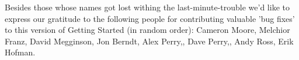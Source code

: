 Besides those whose names got lost withing the last-minute-trouble we'd like to express our
gratitude to the following people for contributing valuable 'bug fixes' to this version of Getting Started (in random order): Cameron Moore, Melchior Franz, David Megginson, Jon Berndt, Alex Perry,, Dave Perry,, Andy Ross, Erik Hofman. 

